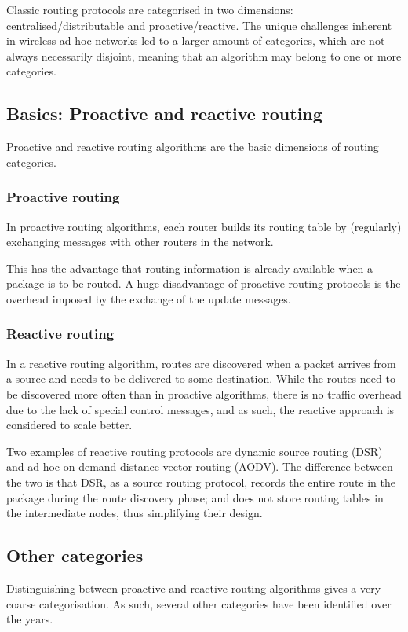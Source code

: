 Classic routing protocols are categorised in two dimensions:
centralised/distributable and proactive/reactive.
The unique challenges inherent in wireless ad-hoc networks led to a larger
amount of categories, which are not always necessarily disjoint, meaning
that an algorithm may belong to one or more categories.

\subsection{Basics: Proactive and reactive routing}
Proactive and reactive routing algorithms are the basic dimensions of routing
categories.

\subsubsection*{Proactive routing}
In proactive routing algorithms, each router builds its routing table by
(regularly) exchanging messages with other routers in the network.

This has the advantage that routing information is already available when a
package is to be routed.
A huge disadvantage of proactive routing protocols is the overhead imposed
by the exchange of the update messages.

\subsubsection*{Reactive routing}
In a reactive routing algorithm, routes are discovered when a packet arrives
from a source and needs to be delivered to some destination.
While the routes need to be discovered more often than in proactive algorithms,
there is no traffic overhead due to the lack of special control messages, and
as such, the reactive approach is considered to scale better.

Two examples of reactive routing protocols are dynamic source routing (DSR)
and ad-hoc on-demand distance vector routing (AODV). The difference between
the two is that DSR, as a source routing protocol, records the entire route
in the package during the route discovery phase; and does not store routing
tables in the intermediate nodes, thus simplifying their design.

\subsection{Other categories}
Distinguishing between proactive and reactive routing algorithms gives a very
coarse categorisation. As such, several other categories have been identified
over the years.

